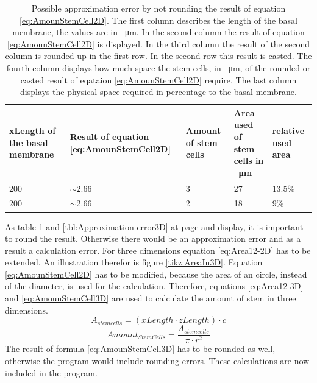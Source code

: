 \begin{table}[ht]
\centering
\caption[Approximation errors of a not rounded result, with which it is further calculated]{Possible approximation error by not rounding the result of equation \ref{eq:AmounStemCell2D}. The first column describes the length of the basal membrane, the values are  in \SI{}{\micro\metre}. In the second column the result of equation \ref{eq:AmounStemCell2D} is displayed. In the third column the result of the second column is rounded up in the first row. In the second row this result is casted. The fourth column displays how much space the stem cells, in \SI{}{\micro\metre}, of the rounded or casted result of eqataion \ref{eq:AmounStemCell2D} require. The last column displays the physical space required in percentage to the basal membrane. \newline}
\renewcommand{\arraystretch}{1.5}
	\begin{tabularx}{\textwidth}{|X|X|X|X|X|}
	\hline
		xLength of the basal membrane & Result of equation \ref{eq:AmounStemCell2D} & Amount of stem cells & Area used of stem cells  in \SI{}{\micro\metre} & relative used area  \\
		\hline
	\hline
		
		200 & $\sim 2.66$ & 3 & 27 & 13.5\% \\
		\hline
		200 & $\sim 2.66$ & 2 & 18 & 9\% 
\tabularnewline
\hline 
	\end{tabularx}
	\label{tbl:Approximation error2D}
\end{table}

As table \ref{tbl:Approximation error2D} and \ref{tbl:Approximation error3D} at page \pageref{eq:AmounStemCell2D} and \pageref{tbl:Approximation error3D} display, it is important to round the result. Otherwise there would be an approximation error and as a result a calculation error. \newline
For three dimensions equation \ref{eq:Area12-2D} has to be extended. An illustration therefor is figure \ref{tikz:AreaIn3D}. Equation \ref{eq:AmounStemCell2D} has to be modified, because the area of an circle, instead of the diameter, is used for the calculation. Therefore, equations \ref{eq:Area12-3D} and \ref{eq:AmounStemCell3D} are used to calculate the amount of stem in three dimensions.
\begin{equation}\label{eq:Area12-3D}
A_{stem cells} = (xLength \cdot zLength) \cdot c
\end{equation}
\begin{equation}\label{eq:AmounStemCell3D}
Amount_{StemCells} = \dfrac{A_{stem cells}}{\pi \cdot r^{2}} 
\end{equation}
The result of formula \ref{eq:AmounStemCell3D} has to be rounded as well, otherwise the program would include rounding errors. 
These calculations are now included in the program.

